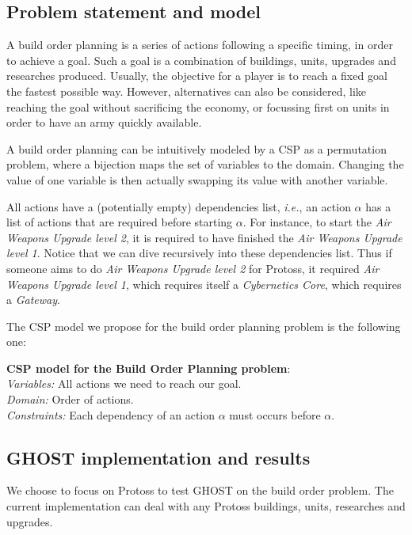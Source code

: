 \documentclass[journal]{IEEEtran}
\newcommand{\csp}{\textsc{CSP}\xspace}
\newcommand{\ghost}{\textsc{GHOST}\xspace}
\newcommand{\ie}{\textit{i.e.}}
\newcommand{\modelcsp}[4]%
{ \begin{trivlist}
  \item[]%
    \textbf{CSP model for #1}:\\
    \textit{Variables:} #2\\
    \textit{Domain:} #3\\
    \textit{Constraints:} #4
  \end{trivlist}%
}
\begin{document}
\subsection{Problem statement and model}
A build  order planning is  a series  of actions following  a specific
timing, in order  to achieve a goal.  Such a goal is  a combination of
buildings,  units,  upgrades  and researches  produced.  Usually,  the
objective for a  player is to reach a fixed  goal the fastest possible
way. However, alternatives  can also be considered,  like reaching the
goal without sacrificing  the economy, or focussing first  on units in
order to have an army quickly available.

A  build order  planning can  be intuitively  modeled by  a \csp  as a
permutation problem,  where a bijection  maps the set of  variables to
the  domain. Changing  the  value  of one  variable  is then  actually
swapping its value with another variable.

All  actions have  a (potentially  empty) dependencies  list, \ie,  an
action  $\alpha$  has a  list  of  actions  that are  required  before
starting  $\alpha$.  For  instance, to  start the  \textit{Air Weapons
  Upgrade level  2}, it is  required to have finished  the \textit{Air
  Weapons Upgrade level  1}. Notice that we can  dive recursively into
these  dependencies  list. Thus  if  someone  aims to  do  \textit{Air
  Weapons  Upgrade  level  2}  for Protoss,  it  required  \textit{Air
  Weapons    Upgrade   level    1},    which    requires   itself    a
\textit{Cybernetics Core}, which requires a \textit{Gateway}.

The \csp model we propose for  the build order planning problem is the
following one:
\modelcsp{the Build Order Planning problem}%
{All actions we need to reach our goal.}%
{Order of actions.}%
{Each dependency of an action $\alpha$ must occurs before $\alpha$.}

\subsection{\ghost implementation and results}

We  choose to  focus on  Protoss  to test  \ghost on  the build  order
problem.  The  current  implementation   can  deal  with  any  Protoss
buildings, units, researches and upgrades.
\end{document}
